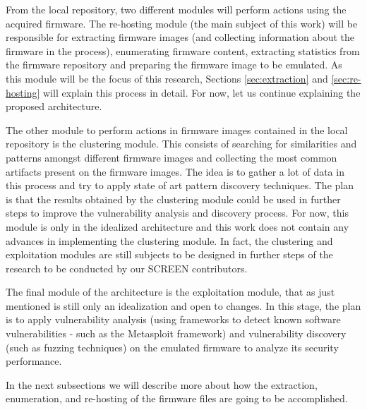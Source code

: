 From the local repository, two different modules will perform actions using the acquired firmware. The re-hosting module (the main subject of this work) will be responsible for extracting firmware images (and collecting information about the firmware in the process), enumerating firmware content, extracting statistics from the firmware repository and preparing the firmware image to be emulated. As this module will be the focus of this research, Sections \ref{sec:extraction} and \ref{sec:re-hosting} will explain this process in detail. For now, let us continue explaining the proposed architecture. 


The other module to perform actions in firmware images contained in the local repository is the clustering module. This consists of searching for similarities and patterns amongst different firmware images and collecting the most common artifacts present on the firmware images. The idea is to gather a lot of data in this process and try to apply state of art pattern discovery techniques. The plan is that the results obtained by the clustering module could be used in further steps to improve the vulnerability analysis and discovery process. For now, this module is only in the idealized architecture and this work does not contain any advances in implementing the clustering module. In fact, the clustering and exploitation modules are still subjects to be designed in further steps of the research to be conducted by our SCREEN contributors.

The final module of the architecture is the exploitation module, that as just mentioned is still only an idealization and open to changes. In this stage, the plan is to apply vulnerability analysis (using frameworks to detect known software vulnerabilities - such as the Metasploit framework) and vulnerability discovery (such as fuzzing techniques) on the emulated firmware to analyze its security performance.

In the next subsections we will describe more about how the extraction, enumeration, and re-hosting of the firmware files are going to be accomplished.

